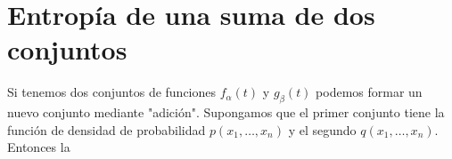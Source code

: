 \clearpage

\section{Entrop\'ia de una suma de dos conjuntos}
\label{s23}

Si tenemos dos conjuntos de funciones $f_{\alpha} \left( t \right)$ y
$g_{\beta} \left( t \right)$ podemos formar un nuevo conjunto mediante
"adici\'on". Supongamos que el primer conjunto tiene la funci\'on de
densidad de probabilidad $p \left( x_{1}, \dots , x_{n} \right)$ y el
segundo $q \left( x_{1}, \dots , x_{n} \right)$. Entonces la

